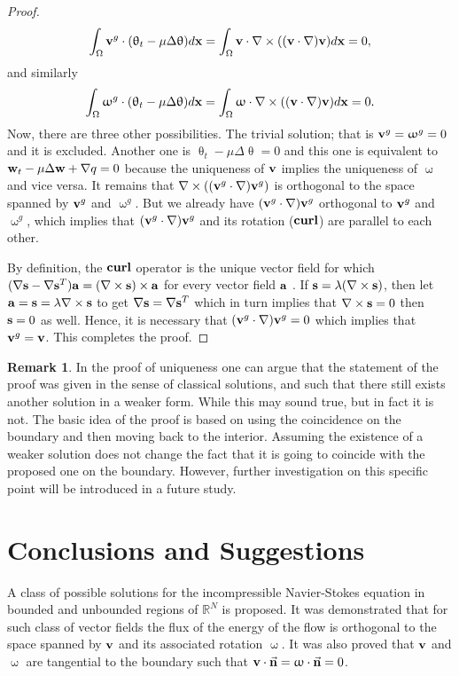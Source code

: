 \documentclass[a4 paper, 11pt,twoside]{article}
\newcommand{\Bf}[1]{{\bf{#1}}}
\newcommand{\V}{{\bf{v}}}
\newcommand{\X}{{\bf{x}}}
\newcommand{\0}{\Bf{0}}
\theoremstyle{definition}
\newtheorem*{rem}{Remark}
\begin{document}
\begin{proof}
\begin{equation}
\int_\Omega\V^g\cdot(\uptheta_t-\mu\Delta\uptheta)d\X=\int_{\Omega}\V\cdot\nabla\times((\V\cdot\nabla)\V) d\X=0,
\label{uniqIDw6}
\end{equation}
and similarly
\begin{equation}
\int_\Omega\upomega^g\cdot(\uptheta_t-\mu\Delta\uptheta)d\X=\int_{\Omega}\upomega\cdot\nabla\times((\V\cdot\nabla)\V) d\X=0.
\label{uniqIDw7}
\end{equation}
Now, there are three other possibilities. The trivial solution; that is $\V^g=\upomega^g=0$ and it is excluded. Another one is $\uptheta_t-\mu\Delta\uptheta=0$ and this one is equivalent to $\Bf{w}_t-\mu\Delta\Bf{w}+\nabla q=0$ because the uniqueness of $\V$ implies the uniqueness of $\upomega$ and vice versa. It remains that $\nabla\times((\V^g\cdot\nabla)\V^g)$ is orthogonal to the space spanned by $\V^g$ and $\upomega^g$. But we already have $(\V^g\cdot\nabla)\V^g$ orthogonal to $\V^g$ and $\upomega^g$, which implies that $(\V^g\cdot\nabla)\V^g$ and its rotation ($\Bf{curl}$) are parallel to each other.

By definition, the $\Bf{curl}$ operator is the unique vector field for which $(\nabla \Bf{s}-\nabla\Bf{s}^T)\Bf{a}=(\nabla\times\Bf{s})\times \Bf{a}$ for every vector field $\Bf{a}$ \cite[p. 32]{gurtin}. If $\Bf{s}=\lambda(\nabla\times\Bf{s})$, then let $\Bf{a}=\Bf{s}=\lambda\nabla\times\Bf{s}$ to get $\nabla\Bf{s}=\nabla\Bf{s}^T$ which in turn implies that $\nabla\times\Bf{s}=0$ then $\Bf{s}=0$ as well. Hence, it is necessary that $(\V^g\cdot\nabla)\V^g=0$ which implies that $\V^g=\V$. This completes the proof.
\end{proof}
\begin{rem}
In the proof of uniqueness one can argue that the statement of the proof was given in the sense of classical solutions, and such that there still exists another solution in a weaker form. While this may sound true, but in fact it is not. The basic idea of the proof is based on using the coincidence on the boundary and then moving back to the interior. Assuming the existence of a weaker solution does not change the fact that it is going to coincide with the proposed one on the boundary. However, further investigation on this specific point will be introduced in a future study.
\end{rem}
\section{Conclusions and Suggestions}
A class of possible solutions for the incompressible Navier-Stokes equation in bounded and unbounded regions of $\mathbb{R}^N$ is proposed. It was demonstrated that for such class of vector fields the flux of the energy of the flow is orthogonal to the space spanned by $\V$ and its associated rotation $\upomega$. It was also proved that $\V$ and $\upomega$ are tangential to the boundary such that $\V\cdot\vec{\Bf{n}}=\upomega\cdot\vec{\Bf{n}}=0$.
\end{document}
